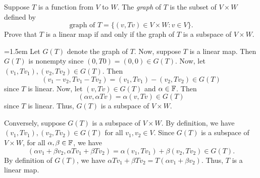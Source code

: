 \begin{exc}

\begin{exercise}
Suppose $T$ is a function from $V$ to $W$. The \emph{graph} of $T$ is the
subset of $V\times W$ defined by
\[ \text{graph of } T = \{(v,Tv)\in V\times W : v\in V\}. \]
Prove that $T$ is a linear map if and only if the graph of $T$ is a subspace of
$V\times W$.
\end{exercise}
\begin{solution}\emergencystretch=1.5em
Let $G(T)$ denote the graph of $T$. Now, suppose $T$ is a linear map. Then
$G(T)$ is nonempty since $(0,T0)=(0,0)\in G(T)$. Now, let
$(v_1,Tv_1),(v_2,Tv_2)\in G(T)$. Then
\[ (v_1-v_2,Tv_1-Tv_2) = (v_1,Tv_1)-(v_2,Tv_2)\in G(T) \]
since $T$ is linear. Now, let $(v,Tv)\in G(T)$ and $\alpha\in\mathbb{F}$. Then
\[ (\alpha v,\alpha Tv) = \alpha(v,Tv)\in G(T) \]
since $T$ is linear. Thus, $G(T)$ is a subspace of $V\times W$.

Conversely, suppose $G(T)$ is a subspace of $V\times W$. By definition, we have
$(v_1,Tv_1),\allowbreak(v_2,Tv_2)\in G(T)$ for all $v_1,v_2\in V$. Since $G(T)$ is a
subspace of $V\times W$, for all $\alpha,\beta\in\mathbb{F}$, we have
\[ (\alpha v_1+\beta v_2,\alpha Tv_1+\beta Tv_2)
   = \alpha(v_1,Tv_1)+\beta(v_2,Tv_2)\in G(T). \]
By definition of $G(T)$, we have $\alpha Tv_1+\beta Tv_2=T(\alpha v_1+\beta
v_2)$. Thus, $T$ is a linear map.
\end{solution}


\end{exc}
